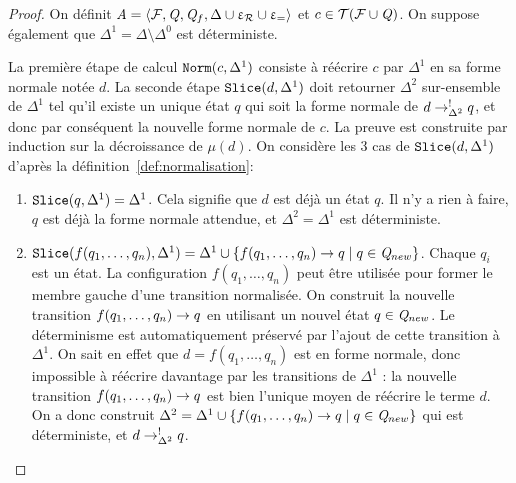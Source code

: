 \begin{proof}
  On définit $\mathit A = \langle \mathcal{F}, \mathit Q, \mathit Q_f, \Delta \cup \upvarepsilon_{\mathcal R} \cup \upvarepsilon_{=}\rangle$ et $c \in \mathcal{ T(F \cup \mathit Q)}$.
  On suppose également que $\Delta^1 = \Delta \setminus \Delta^0$ est déterministe.

  La première étape de calcul $\mathtt{Norm}(c, \Delta^1)$ consiste à réécrire $c$ par
  $\Delta^1$ en sa forme normale notée $d$.   
  La seconde étape $\mathtt{Slice}(d, \Delta^1)$ doit retourner $\Delta^2$ sur-ensemble de $\Delta^1$
  tel qu'il existe un unique état $q$ qui soit la forme normale de $d \rightarrow^!_{\Delta^2} q$, et donc 
  par conséquent la nouvelle forme normale de $c$.
  La preuve est construite par induction sur la décroissance de $\mu(d)$.
  On considère les 3 cas de $\mathtt{Slice}(d, \Delta^1)$ d'après la définition~\ref{def:normalisation}:
   
  \begin{enumerate}
  \item $\mathtt{Slice}(q, \Delta^1) = \Delta^1$. Cela signifie que $d$ est déjà un état $q$. 
    Il n'y a rien à faire, $q$ est déjà la forme normale attendue,
    et $\Delta^2 = \Delta^1$ est déterministe.
  \item $\mathtt{Slice}(f(q_1, \dots, q_n), \Delta^1) = \Delta^1 \cup \{ f(q_1, \dots, q_n) \rightarrow q \; | \; q \in \mathit Q_{new}\}$. 
    Chaque $q_i$ est un état. La configuration $f(q_1, \dots, q_n)$ peut être utilisée pour former le membre gauche d'une transition
    normalisée. On construit la nouvelle transition $f(q_1, \dots, q_n) \rightarrow q$ en utilisant un nouvel état $q \in \mathit Q_{new}$. 
    Le déterminisme est automatiquement préservé par l'ajout de cette transition à $\Delta^1$. On sait en effet
    que $d = f(q_1, \dots, q_n)$ est en forme normale, donc impossible à réécrire davantage par les transitions de 
    $\Delta^1$ : la nouvelle transition $f(q_1, \dots, q_n) \rightarrow q$ est bien l'unique moyen de réécrire le terme $d$. On a donc construit
    $\Delta^2 = \Delta^1 \cup \{ f(q_1, \dots, q_n) \rightarrow q \; | \; q \in \mathit Q_{new}\}$ qui est déterministe, et $d \rightarrow^!_{\Delta^2} q$.
     

\end{enumerate}
\end{proof}

